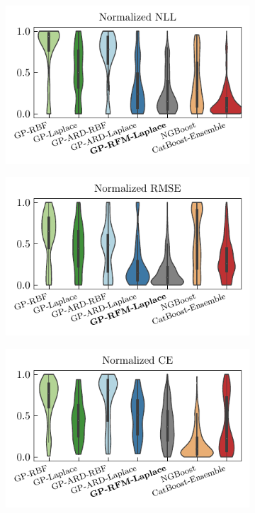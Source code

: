 \begin{figure}[htb]
    \centering
    \begin{subfigure}[b]{0.475\textwidth}
        \centering
        \includegraphics[trim=0 40 0 0, clip, width=\textwidth]{figures/tabularbenchmark_nll.pdf}
    \end{subfigure}
    \begin{subfigure}[b]{0.475\textwidth}
        \centering
        \includegraphics[trim=0 40 0 0, clip, width=\textwidth]{figures/tabularbenchmark_rmse.pdf}
    \end{subfigure}
    \begin{subfigure}[b]{0.475\textwidth}
        \centering
        \includegraphics[width=\textwidth]{figures/tabularbenchmark_coverage.pdf}

\end{subfigure}
\end{figure}
